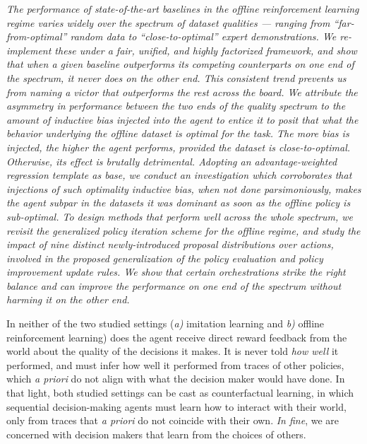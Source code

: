 \emph{%
The performance of state-of-the-art baselines in the offline reinforcement learning regime varies widely over the
spectrum of dataset qualities --- ranging from \textit{``far-from-optimal''} random data
to \textit{``close-to-optimal''} expert demonstrations.
We re-implement these under a fair, unified, and highly factorized framework,
and show that when a given baseline outperforms its competing counterparts
on one end of the spectrum, it \emph{never} does on the other end.
This consistent trend prevents us from naming a victor that outperforms the rest across the board.
We attribute the asymmetry in performance between the two ends of the quality spectrum to
the amount of inductive bias injected into the agent to entice it to posit that what the behavior underlying
the offline dataset is \emph{optimal} for the task.
The more bias is injected, the higher the agent performs, \emph{provided the dataset is close-to-optimal}.
Otherwise, its effect is brutally detrimental.
Adopting an advantage-weighted regression template as base, we conduct an investigation which corroborates that
injections of such \emph{optimality} inductive bias, when not done parsimoniously,
makes the agent subpar in the datasets it was dominant as soon as the offline policy is sub-optimal.
To design methods that perform well across the whole spectrum,
we revisit the generalized policy iteration scheme for the offline regime, and study the impact of nine distinct
newly-introduced proposal distributions over actions, involved in the proposed generalization of the
policy evaluation and policy improvement update rules.
We show that certain orchestrations strike the right balance and can improve the performance on one end of the spectrum
\emph{without} harming it on the other end.
}

In neither of the two studied settings
(\textit{a)} imitation learning and \textit{b)} offline reinforcement learning)
does the agent receive direct reward feedback from the world
about the quality of the decisions it makes.
It is never told \emph{how well} it performed, and must infer how well it performed from
traces of other policies, which \textit{a priori} do not align with what the decision maker would have done.
In that light, both studied settings
can be cast as counterfactual learning,
in which sequential decision-making agents must learn how to interact with their world,
only from traces that \textit{a priori} do not coincide with their own.
\textit{In fine}, we are concerned with decision makers that learn from the choices of others.


